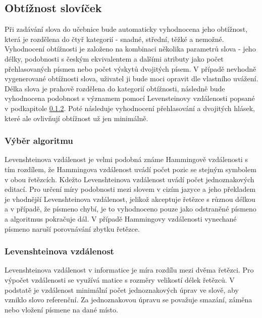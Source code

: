 \documentclass[a4paper,11pt,titlepage,fleqn]{article}
\begin{document}
    \subsection{Obtížnost slovíček}
        Při zadávání slova do učebnice bude automaticky vyhodnocena jeho obtížnost, která je rozdělena do čtyř kategorií - snadné, střední, těžké a nemožné. Vyhodnocení obtížnosti je založeno na kombinaci několika parametrů slova - jeho délky, podobnosti s českým ekvivalentem a dalšími atributy jako počet přehlasovaných písmen nebo počet výskytů dvojitých písem. V případě nevhodně vygenerované obtížnosti slova, uživatel ji bude moci opravit dle vlastního uvážení. Délka slova je prahově rozdělena do kategorií obtížnosti, následně bude vyhodnocena podobnost s významem pomocí Levensteinovy vzdálenosti popsané v podkapitole \ref{levenstein}. Poté následuje vyhodnocení přehlasování a dvojitých hlásek, které ale ovlivňují obtížnost už jen minimálně.

        \subsubsection{Výběr algoritmu}       
            Levenshteinova vzdálenost je velmi podobná známe Hammingově vzdálenosti s tím rozdílem, že Hammingova vzdálenost uvádí počet pozic se stejným symbolem v obou řetězcích. Kdežto Levenshteinova vzdálenost uvádí počet jednoznakových editací. Pro určení míry podobnosti mezi slovem v cizím jazyce a jeho překladem je vhodnější Levenshteinova vzdálenost, jelikož akceptuje řetězce s různou délkou a v případě, že písmeno chybí, je to vyhodnoceno pouze jako odstraněné písmeno a algoritmus pokračuje dál. V případě Hammingovy vzdálenosti vynechané písmeno naruší porovnávání zbytku řetězce.

        \subsubsection{Levenshteinova vzdálenost}
            \label{levenstein}
            Levenshteinova vzdálenost v informatice je míra rozdílu mezi dvěma řetězci. Pro výpočet vzdálenosti se využívá matice s rozměry velikostí délek řetězců. V podstatě je vzdálenost minimální počet jednoznakových úprav ve slově, aby vzniklo slovo referenční. Za jednoznakovou úpravu se považuje smazání, záměna nebo vložení písmene na dané místo\cite{bib:levensthtein}.
\end{document}
